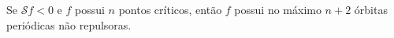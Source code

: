 %
%
%
%

\begin{theorem}[Singer]
Se $\mathcal{S}f < 0$ e $f$ possui $n$ pontos críticos, então $f$ possui no máximo $n+2$ órbitas periódicas não repulsoras.
\end{theorem}

